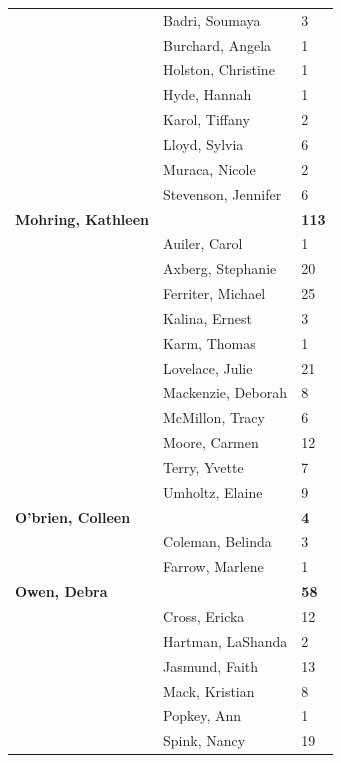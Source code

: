 \documentclass{article}\usepackage[]{graphicx}\usepackage[]{color}
\begin{document}
{\begin{longtable} { >{\raggedright}p{}|p{}p{}}
   & Badri, Soumaya & 3 \\ 
   \rowcolor[gray]{0.90} & Burchard, Angela & 1 \\ 
   \rowcolor[gray]{0.90} & Holston, Christine & 1 \\ 
   \rowcolor[gray]{0.90} & Hyde, Hannah & 1 \\ 
   & Karol, Tiffany & 2 \\ 
   & Lloyd, Sylvia & 6 \\ 
   & Muraca, Nicole & 2 \\ 
   \rowcolor[gray]{0.90} & Stevenson, Jennifer & 6 \\ 
   \rowcolor[gray]{0.90}\textbf{Mohring, Kathleen} &  & \hspace{2cm}\textbf{113} \\ 
   \rowcolor[gray]{0.90} & Auiler, Carol & 1 \\ 
   & Axberg, Stephanie & 20 \\ 
   & Ferriter, Michael & 25 \\ 
   & Kalina, Ernest & 3 \\ 
   \rowcolor[gray]{0.90} & Karm, Thomas & 1 \\ 
   \rowcolor[gray]{0.90} & Lovelace, Julie & 21 \\ 
   \rowcolor[gray]{0.90} & Mackenzie, Deborah & 8 \\ 
   & McMillon, Tracy & 6 \\ 
   & Moore, Carmen & 12 \\ 
   & Terry, Yvette & 7 \\ 
   \rowcolor[gray]{0.90} & Umholtz, Elaine & 9 \\ 
   \rowcolor[gray]{0.90}\textbf{O'brien, Colleen} &  & \hspace{2cm}\textbf{4} \\ 
   \rowcolor[gray]{0.90} & Coleman, Belinda & 3 \\ 
   & Farrow, Marlene & 1 \\ 
  \textbf{Owen, Debra} &  & \hspace{2cm}\textbf{58} \\ 
   & Cross, Ericka & 12 \\ 
   \rowcolor[gray]{0.90} & Hartman, LaShanda & 2 \\ 
   \rowcolor[gray]{0.90} & Jasmund, Faith & 13 \\ 
   \rowcolor[gray]{0.90} & Mack, Kristian & 8 \\ 
   & Popkey, Ann & 1 \\ 
   & Spink, Nancy & 19 \\ 

\end{longtable}}
\end{document}
